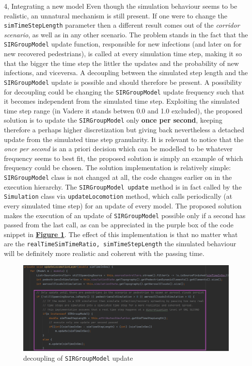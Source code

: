 \documentclass[10pt,a4paper]{article}
\begin{document}
\begin{task}{4, Integrating a new model}
Even though the simulation behaviour seems to be realistic, an unnatural mechanism is still present. If one were to change the \texttt{simTimeStepLength} parameter then a different result comes out of the \textit{corridor scenario}, as well as in any other scenario. The problem stands in the fact that the \texttt{SIRGroupModel} update function, responsible for new infections (and later on for new recovered pedestrians), is called at every simulation time step, making it so that the bigger the time step the littler the updates and the probability of new infections, and viceversa. A decoupling between the simulated step length and the \texttt{SIRGroupModel} update is possible and should therefore be present.\newline
A possibility for decoupling could be changing the \texttt{SIRGroupModel} update frequency such that it becomes independent from the simulated time step. Exploiting the simulated time step range (in Vadere it stands betwen 0.0 and 1.0 excluded), the proposed solution is to update the \texttt{SIRGroupModel} only \textbf{once per second}, keeping therefore a perhaps higher discretization but giving back nevertheless a detached update from the simulated time step granularity. It is relevant to notice that the \textit{once per second} is an a priori decision which can be modelled to be whatever frequency seems to best fit, the proposed solution is simply an example of which frequency could be chosen.\newline
The solution implementation is relatively simple: \texttt{SIRGroupModel} class is not changed at all, the code changes earlier on in the execution hierarchy. The \texttt{SIRGroupModel update} method is in fact called by the \texttt{Simulation} class via \texttt{updateLocomotion} method, which calls periodically (at every simulated time step) for an update of every model. The proposed solution makes the execution of an update of \texttt{SIRGroupModel} possible only if a second has passed from the last call, as can be appreciated in the purple box of the code snippet in \textbf{\hyperref[fig:decouple-snippet]{Figure \ref{fig:decouple-snippet}}}.\newline
The effect of this implementation is that no matter what are the \texttt{realTimeSimTimeRatio, simTimeStepLength} the simulated behaviour will be definitely more realistic and coherent with the passing time.

\begin{figure}[H]
\centering
    \includegraphics[scale=0.5]{images/4.6.png}
    \caption{decoupling of \texttt{SIRGroupModel} update}
    \label{fig:decouple-snippet}
\end{figure}


\end{task}
\end{document}
